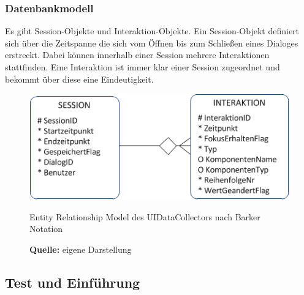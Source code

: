 \subsubsection{Datenbankmodell}
Es gibt Session-Objekte und Interaktion-Objekte. Ein Session-Objekt definiert sich über die Zeitspanne die sich vom Öffnen bis zum Schließen eines Dialoges erstreckt. Dabei können innerhalb einer Session mehrere Interaktionen stattfinden. Eine Interaktion ist immer klar einer Session zugeordnet und bekommt über diese eine Eindeutigkeit.
\begin{figure}[H]
  \centering
  \includegraphics[scale=1]{img/ERM_UIDataCollector.png}
  \caption{Entity Relationship Model des UIDataCollectors nach Barker Notation \citep[vgl.][]{Inguanez2012}}
  \label{fig:ermUIDataCollector}
  \caption*{\textbf{Quelle:} eigene Darstellung}
\end{figure}


\subsection{Test und Einführung}
